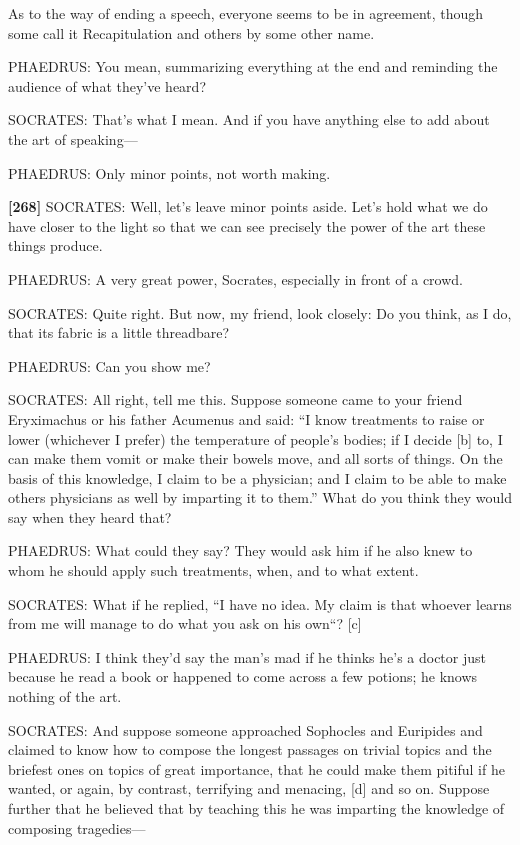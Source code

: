 As to the way of ending a speech, everyone seems to be in agreement,
though some call it Recapitulation and others by some other name.

PHAEDRUS: You mean, summarizing everything at the end and reminding the
audience of what they've heard?

SOCRATES: That's what I mean. And if you have anything else to add about
the art of speaking---

PHAEDRUS: Only minor points, not worth making.

{\bf {[}268{]}} SOCRATES: Well, let's leave minor points aside. Let's
hold what we do have closer to the light so that we can see precisely
the power of the art these things produce.

PHAEDRUS: A very great power, Socrates, especially in front of a crowd.

SOCRATES: Quite right. But now, my friend, look closely: Do you think,
as I do, that its fabric is a little threadbare?

PHAEDRUS: Can you show me?

SOCRATES: All right, tell me this. Suppose someone came to your friend
Eryximachus or his father Acumenus and said: “I know treatments to raise
or lower (whichever I prefer) the temperature of people's bodies; if I
decide {[}b{]} to, I can make them vomit or make their bowels move, and
all sorts of things. On the basis of this knowledge, I claim to be a
physician; and I claim to be able to make others physicians as well by
imparting it to them.” What do you think they would say when they heard
that?

PHAEDRUS: What could they say? They would ask him if he also knew to
whom he should apply such treatments, when, and to what extent.

SOCRATES: What if he replied, “I have no idea. My claim is that whoever
learns from me will manage to do what you ask on his own“? {[}c{]}

PHAEDRUS: I think they'd say the man's mad if he thinks he's a doctor
just because he read a book or happened to come across a few potions; he
knows nothing of the art.

SOCRATES: And suppose someone approached Sophocles and Euripides and
claimed to know how to compose the longest passages on trivial topics
and the briefest ones on topics of great importance, that he could make
them pitiful if he wanted, or again, by contrast, terrifying and
menacing, {[}d{]} and so on. Suppose further that he believed that by
teaching this he was imparting the knowledge of composing tragedies---

